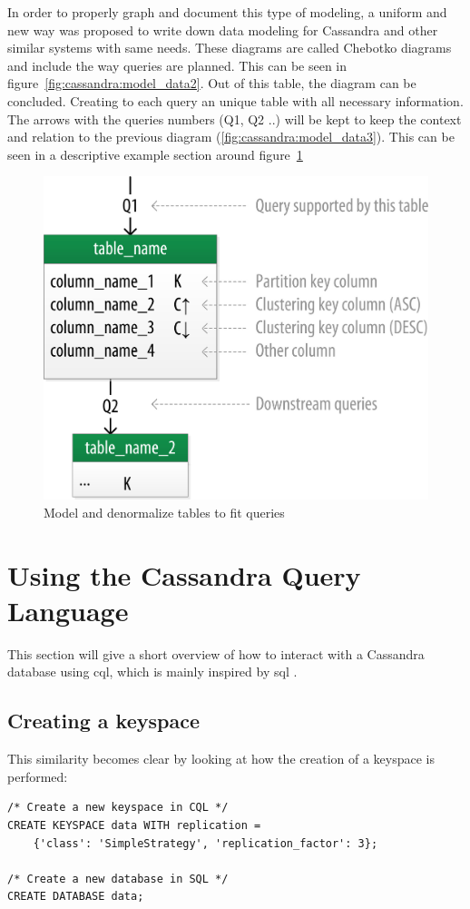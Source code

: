 In order to properly graph and document this type of modeling, a uniform and new way was proposed to write down data modeling for Cassandra and other similar systems with same needs. \autocite{chebotko2015data}
These diagrams are called Chebotko diagrams and include the way queries are planned. This can be seen in figure~\ref{fig:cassandra:model_data2}.
Out of this table, the diagram can be concluded. Creating to each query an unique table with all necessary information. The arrows with the queries numbers (Q1, Q2 ..) will be kept to keep the context and relation to the previous diagram (\ref{fig:cassandra:model_data3}).
This can be seen in a descriptive example section around figure~\ref{fig:cassandra:chebotko}

\begin{figure}[H]
    \centering
    \includegraphics[width=0.75\columnwidth]{img/model_example_primary_key.jpeg}
    \caption{Model and denormalize tables to fit queries \autocite{cassandra_oreilly}}
    \label{fig:cassandra:chebotko}
\end{figure}

\section{Using the Cassandra Query Language} \label{sec:cassandra:cql} %
This section will give a short overview of how to interact with a Cassandra database using \gls{cql}, which is mainly inspired by \gls{sql} \autocite{cqlAlexMeng, newInCQL3, cassandra3cqldocCreateKeystore}.

\subsection {Creating a keyspace}
This similarity becomes clear by looking at how the creation of a keyspace is performed:
\begin{verbatim}
/* Create a new keyspace in CQL */
CREATE KEYSPACE data WITH replication =
    {'class': 'SimpleStrategy', 'replication_factor': 3};

/* Create a new database in SQL */
CREATE DATABASE data;
\end{verbatim}

